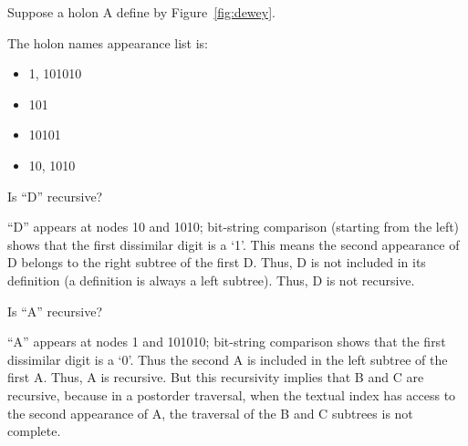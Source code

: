 \documentclass[openany,nobib]{tufte-book}
\begin{document}
Suppose a holon A define by Figure~\ref{fig:dewey}.

\begin{marginfigure}[1cm]
\caption{A binary tree labeled with Dewey binary notation.}
\label{fig:dewey}
\end{marginfigure}

The holon names appearance list is:

\begin{itemize}
\setlength{\itemindent}{1cm}
\setlength\itemsep{-0.5em}
    \item[A:] 1, 101010
    \item[B:] 101
    \item[C:] 10101
    \item[D:] 10, 1010
\end{itemize}

Is ``D'' recursive?

``D'' appears at nodes 10 and 1010; bit-string comparison (starting from the
left) shows that the first dissimilar digit is a `1'. This means the second
appearance of D belongs to the right subtree of the first D. Thus, D is not
included in its definition (a definition is always a left subtree). Thus, D is
not recursive.

Is ``A'' recursive?

``A'' appears at nodes 1 and 101010; bit-string comparison shows that the first
dissimilar digit is a `0'. Thus the second A is included in the left subtree of
the first A. Thus, A is recursive. But this recursivity implies that B and C
are recursive, because in a postorder traversal, when the textual index has
access to the second appearance of A, the traversal of the B and C subtrees is
not complete.
\end{document}
